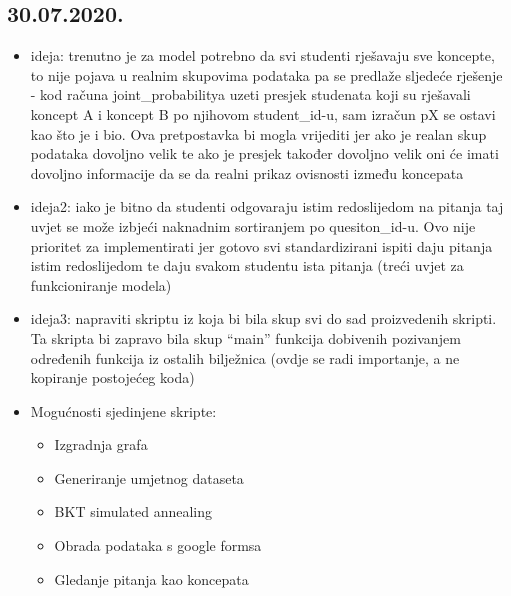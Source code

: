 		\subsection{30.07.2020.}
		\begin{itemize}
			\item 	ideja: trenutno je za model potrebno da svi studenti rješavaju sve koncepte, to nije pojava u realnim skupovima podataka pa se predlaže sljedeće rješenje - kod računa joint\_probabilitya uzeti presjek studenata koji su rješavali koncept A i koncept B po njihovom student\_id-u, sam izračun pX se ostavi kao što je i bio. Ova pretpostavka bi mogla vrijediti jer ako je realan skup podataka dovoljno velik te ako je presjek također dovoljno velik oni će imati dovoljno informacije da se da realni prikaz ovisnosti između koncepata
			\item ideja2: iako je bitno da studenti odgovaraju istim redoslijedom na pitanja taj uvjet se može izbjeći naknadnim sortiranjem po quesiton\_id-u. Ovo nije prioritet za implementirati jer gotovo svi standardizirani ispiti daju pitanja istim redoslijedom te daju svakom studentu ista pitanja (treći uvjet za funkcioniranje modela)
			\item ideja3: napraviti skriptu iz koja bi bila skup svi do sad proizvedenih skripti. Ta skripta bi zapravo bila skup “main” funkcija dobivenih pozivanjem određenih funkcija iz  ostalih bilježnica (ovdje se radi importanje, a ne kopiranje postojećeg koda)
			\item Mogućnosti sjedinjene skripte:
			\begin{itemize}
				\item Izgradnja grafa
				\item Generiranje umjetnog dataseta
				\item BKT simulated annealing
				\item Obrada podataka s google formsa
				\item Gledanje pitanja kao koncepata
			\end{itemize}
		\end{itemize}
	
